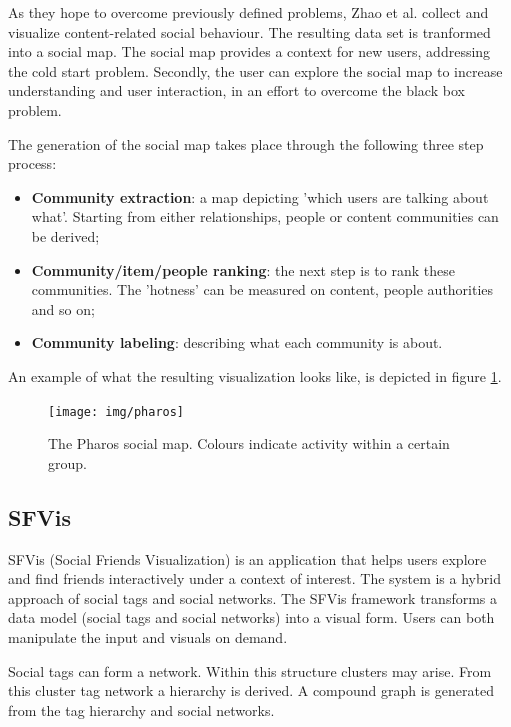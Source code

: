As they hope to overcome previously defined problems, Zhao et al. \cite{zhao:2010} collect and visualize content-related social behaviour. The resulting data set is tranformed into a social map. The social map provides a context for new users, addressing the cold start problem. Secondly, the user can explore the social map to increase understanding and user interaction, in an effort to overcome the black box problem.

The generation of the social map takes place through the following three step process:

\begin{itemize}
	\item \textbf{Community extraction}: a map depicting 'which users are talking about what'. Starting from either relationships, people or content communities can be derived;
	\item \textbf{Community/item/people ranking}: the next step is to rank these communities. The 'hotness' can be measured on content, people authorities and so on;
	\item \textbf{Community labeling}: describing what each community is about.
\end{itemize}

An example of what the resulting visualization looks like, is depicted in figure \ref{figure:pharos}.

\begin{figure}%
	\begin{center}
		\texttt{[image: img/pharos]}%
	\end{center}
	\caption{The Pharos social map. Colours indicate activity within a certain group.}%
	\label{figure:pharos}%
\end{figure}




\subsection{SFVis}\label{chapter:survey:section:applications:subsection:sfvis}

SFVis (Social Friends Visualization) is an application that helps users explore and find friends interactively under a context of interest. The system is a hybrid approach of social tags and social networks. The SFVis framework transforms a data model (social tags and social networks) into a visual form. Users can both manipulate the input and visuals on demand.

Social tags can form a network. Within this structure clusters may arise. From this cluster tag network a hierarchy is derived. A compound graph is generated from the tag hierarchy and social networks.

